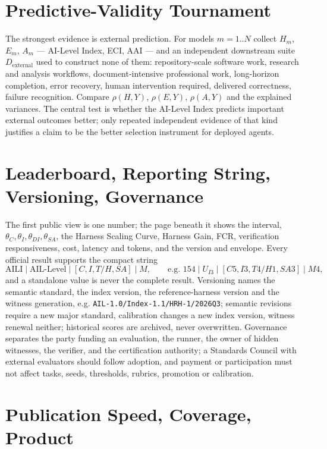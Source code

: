 \section{Predictive-Validity Tournament}\label{sec:tournament}

The strongest evidence is external prediction. For models $m = 1..N$ collect $H_m$, $E_m$, $A_m$ --- AI-Level Index, ECI, AAI --- and an independent downstream suite $D_{\mathrm{external}}$ used to construct none of them: repository-scale software work, research and analysis workflows, document-intensive professional work, long-horizon completion, error recovery, human intervention required, delivered correctness, failure recognition. Compare $\rho(H, Y)$, $\rho(E, Y)$, $\rho(A, Y)$ and the explained variances. The central test is whether the AI-Level Index predicts important external outcomes better; only repeated independent evidence of that kind justifies a claim to be the better selection instrument for deployed agents.

\section{Leaderboard, Reporting String, Versioning, Governance}\label{sec:public}

The first public view is one number; the page beneath it shows the interval, $\theta_C, \theta_I, \theta_{DI}, \theta_{SA}$, the Harness Scaling Curve, Harness Gain, FCR, verification responsiveness, cost, latency and tokens, and the version and envelope. Every official result supports the compact string
\[
\mathrm{AILI} \mid \text{AIL-Level} \mid [C, I, T/H, SA] \mid M, \qquad \text{e.g. } 154 \mid U_{I3} \mid [C5, I3, T4/H1, SA3] \mid M4,
\]
and a standalone value is never the complete result. Versioning names the semantic standard, the index version, the reference-harness version and the witness generation, e.g. \texttt{AIL-1.0/\allowbreak Index-1.1/\allowbreak HRH-1/\allowbreak 2026Q3}; semantic revisions require a new major standard, calibration changes a new index version, witness renewal neither; historical scores are archived, never overwritten. Governance separates the party funding an evaluation, the runner, the owner of hidden witnesses, the verifier, and the certification authority; a Standards Council with external evaluators should follow adoption, and payment or participation must not affect tasks, seeds, thresholds, rubrics, promotion or calibration.

\section{Publication Speed, Coverage, Product}\label{sec:product}

